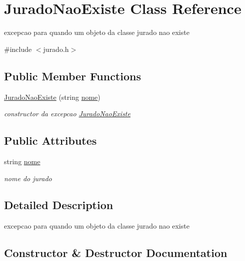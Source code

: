 \hypertarget{classJuradoNaoExiste}{}\section{Jurado\+Nao\+Existe Class Reference}
\label{classJuradoNaoExiste}


excepcao para quando um objeto da classe jurado nao existe  




{\ttfamily \#include $<$jurado.\+h$>$}

\subsection*{Public Member Functions}
\begin{DoxyCompactItemize}
\item 
\hyperlink{classJuradoNaoExiste_a6eb6f183981cb6ce86961e775b7dd8b4}{Jurado\+Nao\+Existe} (string \hyperlink{classJuradoNaoExiste_ac87a8a650e0a9a791687aef1ddc2add2}{nome})
\begin{DoxyCompactList}\small\item\em constructor da excepcao \hyperlink{classJuradoNaoExiste}{Jurado\+Nao\+Existe} \end{DoxyCompactList}\end{DoxyCompactItemize}
\subsection*{Public Attributes}
\begin{DoxyCompactItemize}
\item 
string \hyperlink{classJuradoNaoExiste_ac87a8a650e0a9a791687aef1ddc2add2}{nome}
\begin{DoxyCompactList}\small\item\em nome do jurado \end{DoxyCompactList}\end{DoxyCompactItemize}


\subsection{Detailed Description}
excepcao para quando um objeto da classe jurado nao existe 

\subsection{Constructor \& Destructor Documentation}
